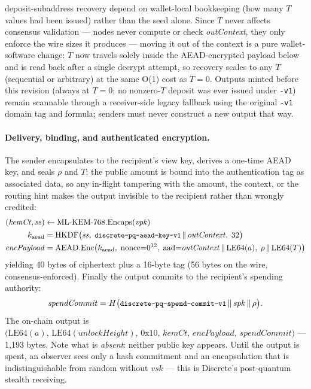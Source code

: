 \documentclass[11pt,a4paper]{article}
\newcommand{\code}[1]{\texttt{\small #1}}
\newcommand{\HKDF}{\mathrm{HKDF}}
\newcommand{\KEM}{\mathrm{ML\text{-}KEM\text{-}768}}
\newcommand{\Enc}{\mathrm{AEAD.Enc}}
\newcommand{\concat}{\,\|\,}
\begin{document}
deposit-subaddress recovery depend on wallet-local bookkeeping (how many $T$
values had been issued) rather than the seed alone. Since $T$ never affects
consensus validation --- nodes never compute or check \emph{outContext}, they
only enforce the wire sizes it produces --- moving it out of the context is a
pure wallet-software change: $T$ now travels solely inside the AEAD-encrypted
payload below and is read back after a single decrypt attempt, so recovery
scales to any $T$ (sequential or arbitrary) at the same O(1) cost as $T{=}0$.
Outputs minted before this revision (always at $T{=}0$; no nonzero-$T$
deposit was ever issued under \code{-v1}) remain scannable through a
receiver-side legacy fallback using the original \code{-v1} domain tag and
formula; senders must never construct a new output that way.

\paragraph{Delivery, binding, and authenticated encryption.}
The sender encapsulates to the recipient's view key, derives a one-time AEAD
key, and seals $\rho$ and $T$; the public amount is bound into the
authentication tag as associated data, so any in-flight tampering with the
amount, the context, or the routing hint makes the output invisible to the
recipient rather than wrongly credited:
\begin{align}
(\mathit{kemCt}, \mathit{ss}) &\leftarrow \KEM.\mathrm{Encaps}(\mathit{vpk}) \\
k_{\mathrm{aead}} &= \HKDF\bigl(\mathit{ss},\;
  \text{\code{discrete-pq-aead-key-v1}} \concat \mathit{outContext},\; 32\bigr) \\
\mathit{encPayload} &= \Enc\bigl(k_{\mathrm{aead}},\; \mathrm{nonce}{=}0^{12},\;
  \mathrm{aad}{=}\mathit{outContext} \concat \mathrm{LE64}(a),\;
  \rho \concat \mathrm{LE64}(T)\bigr)
\end{align}
yielding 40 bytes of ciphertext plus a 16-byte tag (56 bytes on the wire,
consensus-enforced). Finally the output commits to the recipient's spending
authority:
\begin{equation}
\mathit{spendCommit} = H\bigl(\text{\code{discrete-pq-spend-commit-v1}}
 \concat \mathit{spk} \concat \rho\bigr).
\label{eq:spendcommit}
\end{equation}
The on-chain output is
$\bigl(\mathrm{LE64}(a),\, \mathrm{LE64}(\mathit{unlockHeight}),\,
\mathrm{0x10},\, \mathit{kemCt},\, \mathit{encPayload},\,
\mathit{spendCommit}\bigr)$ --- 1{,}193 bytes. Note what is
\emph{absent}: neither public key appears. Until the output is spent, an
observer sees only a hash commitment and an encapsulation that is
indistinguishable from random without $\mathit{vsk}$ --- this is Discrete's
post-quantum stealth receiving.
\end{document}
